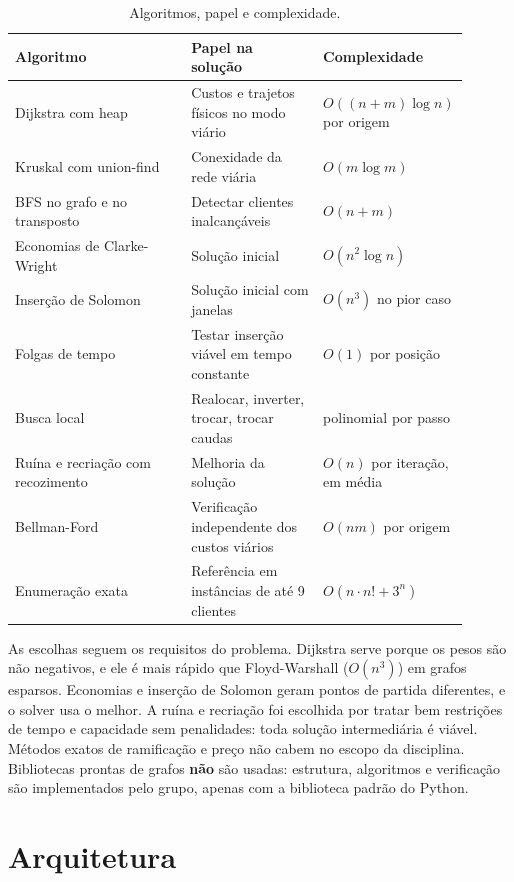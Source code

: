 \documentclass[12pt]{article}
\begin{document}
\begin{table}[!ht]
\centering
\small
\begin{tabular}{L{0.41\linewidth}L{0.30\linewidth}L{0.19\linewidth}}
\toprule
Algoritmo & Papel na solução & Complexidade \\
\midrule
Dijkstra com heap \cite{dijkstra1959} & Custos e trajetos físicos no modo viário & $O((n+m)\log n)$ por origem \\
Kruskal com union-find \cite{kruskal1956} & Conexidade da rede viária & $O(m\log m)$ \\
BFS no grafo e no transposto & Detectar clientes inalcançáveis & $O(n+m)$ \\
Economias de Clarke-Wright \cite{clarke1964} & Solução inicial & $O(n^2\log n)$ \\
Inserção de Solomon \cite{solomon1987} & Solução inicial com janelas & $O(n^3)$ no pior caso \\
Folgas de tempo \cite{savelsbergh1985} & Testar inserção viável em tempo constante & $O(1)$ por posição \\
Busca local & Realocar, inverter, trocar, trocar caudas & polinomial por passo \\
Ruína e recriação \cite{christiaens2020} com recozimento \cite{kirkpatrick1983} & Melhoria da solução & $O(n)$ por iteração, em média \\
Bellman-Ford \cite{clrs2009} & Verificação independente dos custos viários & $O(nm)$ por origem \\
Enumeração exata & Referência em instâncias de até 9 clientes & $O(n\cdot n! + 3^n)$ \\
\bottomrule
\end{tabular}
\caption{Algoritmos, papel e complexidade.}
\end{table}

As escolhas seguem os requisitos do problema. Dijkstra serve porque os pesos são não negativos, e ele é mais rápido que Floyd-Warshall ($O(n^3)$) em grafos esparsos. Economias e inserção de Solomon geram pontos de partida diferentes, e o solver usa o melhor. A ruína e recriação foi escolhida por tratar bem restrições de tempo e capacidade sem penalidades: toda solução intermediária é viável. Métodos exatos de ramificação e preço não cabem no escopo da disciplina. Bibliotecas prontas de grafos \textbf{não} são usadas: estrutura, algoritmos e verificação são implementados pelo grupo, apenas com a biblioteca padrão do Python.

\section{Arquitetura}
\end{document}
